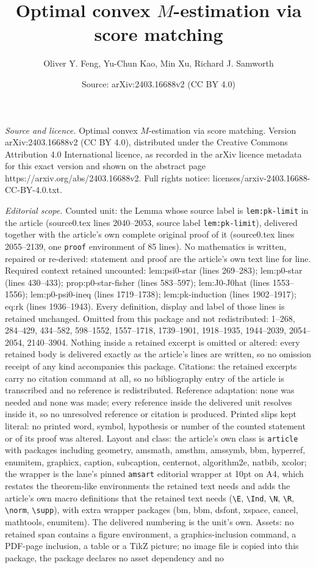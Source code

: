 \documentclass[10pt,a4paper]{amsart}
\title[Optimal convex $M$-estimation via score matching]{Optimal convex $M$-estimation via score matching}
\author{Oliver Y. Feng, Yu-Chun Kao, Min Xu, Richard J. Samworth}
\date{Source: arXiv:2403.16688v2 (CC BY 4.0)}
\begin{document}
\maketitle

\noindent\emph{Source and licence.} Optimal convex $M$-estimation via score matching. Version arXiv:2403.16688v2 (CC BY 4.0), distributed under the Creative Commons Attribution 4.0 International licence, as recorded in the arXiv licence metadata for this exact version and shown on the abstract page https://arxiv.org/abs/2403.16688v2. Full rights notice: licenses/arxiv-2403.16688-CC-BY-4.0.txt.\par\smallskip

\noindent\textit{Editorial scope.} Counted unit: the Lemma whose source label is \texttt{lem:pk-limit} in the article (source0.tex lines 2040--2053, source label \texttt{lem:pk-limit}), delivered together with the article's own complete original proof of it (source0.tex lines 2055--2139, one \texttt{proof} environment of 85 lines). No mathematics is written, repaired or re-derived: statement and proof are the article's own text line for line. Required context retained uncounted: lem:psi0-star (lines 269--283); lem:p0-star (lines 430--433); prop:p0-star-fisher (lines 583--597); lem:J0-J0hat (lines 1553--1556); lem:p0-psi0-ineq (lines 1719--1738); lem:pk-induction (lines 1902--1917); eq:rk (lines 1936--1943). Every definition, display and label of those lines is retained unchanged. Omitted from this package and not redistributed: 1--268, 284--429, 434--582, 598--1552, 1557--1718, 1739--1901, 1918--1935, 1944--2039, 2054--2054, 2140--3904. Nothing inside a retained excerpt is omitted or altered: every retained body is delivered exactly as the article's lines are written, so no omission receipt of any kind accompanies this package. Citations: the retained excerpts carry no citation command at all, so no bibliography entry of the article is transcribed and no reference is redistributed. Reference adaptation: none was needed and none was made; every reference inside the delivered unit resolves inside it, so no unresolved reference or citation is produced. Printed slips kept literal: no printed word, symbol, hypothesis or number of the counted statement or of its proof was altered. Layout and class: the article's own class is \texttt{article} with packages including geometry, amsmath, amsthm, amssymb, bbm, hyperref, enumitem, graphicx, caption, subcaption, centernot, algorithm2e, natbib, xcolor; the wrapper is the lane's pinned \texttt{amsart} editorial wrapper at 10pt on A4, which restates the theorem-like environments the retained text needs and adds the article's own macro definitions that the retained text needs (\texttt{\textbackslash E}, \texttt{\textbackslash Ind}, \texttt{\textbackslash N}, \texttt{\textbackslash R}, \texttt{\textbackslash norm}, \texttt{\textbackslash supp}), with extra wrapper packages (bm, bbm, dsfont, xspace, cancel, mathtools, enumitem). The delivered numbering is the unit's own. Assets: no retained span contains a figure environment, a graphics-inclusion command, a PDF-page inclusion, a table or a TikZ picture; no image file is copied into this package, the package declares no asset dependency and no 
\end{document}
